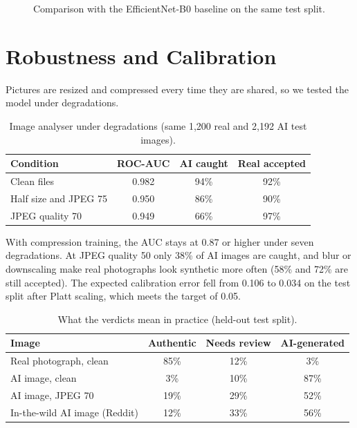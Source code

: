 \begin{figure}[htbp]
  \centering
  
  \caption{Comparison with the EfficientNet-B0 baseline on the same test split.}\label{fig:base}
\end{figure}

\section{Robustness and Calibration}
Pictures are resized and compressed every time they are shared, so we tested the model under degradations.

\begin{table}[htbp]
\centering\small
\caption{Image analyser under degradations (same 1,200 real and 2,192 AI test images).}
\begin{tabular}{lccc}
\toprule
Condition & ROC-AUC & AI caught & Real accepted\\
\midrule
Clean files & 0.982 & 94\% & 92\%\\
Half size and JPEG 75 & 0.950 & 86\% & 90\%\\
JPEG quality 70 & 0.949 & 66\% & 97\%\\
\bottomrule
\end{tabular}
\end{table}

With compression training, the AUC stays at 0.87 or higher under seven degradations. At JPEG quality 50 only 38\% of AI images are caught, and blur or downscaling make real photographs look synthetic more often (58\% and 72\% are still accepted). The expected calibration error fell from 0.106 to 0.034 on the test split after Platt scaling, which meets the target of 0.05.

\begin{table}[htbp]
\centering\small
\caption{What the verdicts mean in practice (held-out test split).}
\begin{tabular}{lccc}
\toprule
Image & Authentic & Needs review & AI-generated\\
\midrule
Real photograph, clean & 85\% & 12\% & 3\%\\
AI image, clean & 3\% & 10\% & 87\%\\
AI image, JPEG 70 & 19\% & 29\% & 52\%\\
In-the-wild AI image (Reddit) & 12\% & 33\% & 56\%\\
\bottomrule
\end{tabular}
\end{table}

